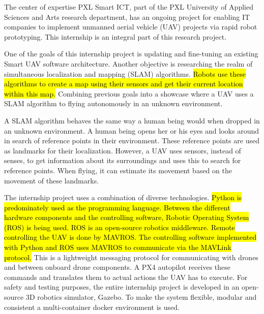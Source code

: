 The center of expertise PXL Smart ICT, part of the PXL University of Applied Sciences and Arts research department, has an ongoing project for enabling IT companies to implement unmanned aerial vehicle (UAV) projects via rapid robot prototyping. This internship is an integral part of this research project.

One of the goals of this internship project is updating and fine-tuning an existing Smart UAV software architecture. Another objective is researching the realm of simultaneous localization and mapping (SLAM) algorithms. \hl{Robots use these algorithms to create a map using their sensors and get their current location within this map.} Combining previous goals into a showcase where a UAV uses a SLAM algorithm to flying autonomously in an unknown environment.

A SLAM algorithm behaves the same way a human being would when dropped in an unknown environment. A human being opens her or his eyes and looks around in search of reference points in their environment. These reference points are used as landmarks for their localization. However, a UAV uses sensors, instead of senses, to get information about its surroundings and uses this to search for reference points. When flying, it can estimate its movement based on the movement of these landmarks.

The internship project uses a combination of diverse technologies. \hl{Python is predominately used as the programming language. Between the different hardware components and the controlling software, Robotic Operating System (ROS) is being used. ROS is an open-source robotics middleware. Remote controlling the UAV is done by MAVROS. The controlling software implemented with Python and ROS uses MAVROS to communicate via the MAVLink protocol.} This is a lightweight messaging protocol for communicating with drones and between onboard drone components. A PX4 autopilot receives these commands and translates them to actual actions the UAV has to execute. For safety and testing purposes, the entire internship project is developed in an open-source 3D robotics simulator, Gazebo. To make the system flexible, modular and consistent a multi-container docker environment is used.

